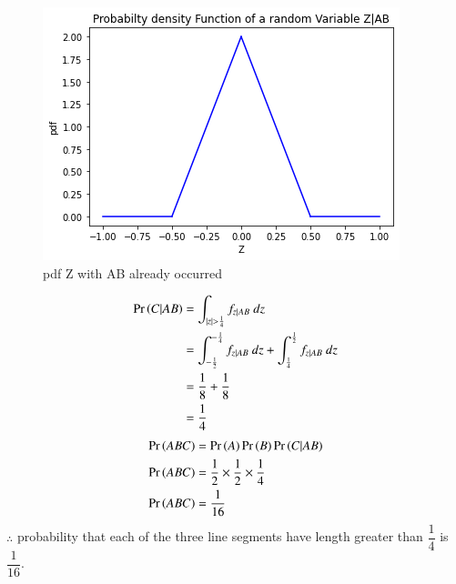 \documentclass[journal,12pt,twocolumn]{IEEEtran}
\begin{document}
\begin{figure}[h]
    \centering
    \includegraphics[width=\columnwidth]{figures/pdf_Z.png}
    \caption{pdf Z with AB already occurred}
    \label{fig:pdf_Z}
\end{figure}
\begin{align}
    \pr{C|AB}&=\int_{|z|>\frac{1}{4}}f_{z|AB}~dz\\
             &=\int_{-\frac{1}{2}}^{-\frac{1}{4}}f_{z|AB}~dz+\int^{\frac{1}{2}}_{\frac{1}{4}}f_{z|AB}~dz\\
             &=\dfrac{1}{8}+\dfrac{1}{8}\\
             &=\dfrac{1}{4}
\end{align}
\begin{align}
    \Pr\left(ABC\right)&=\Pr\left(A\right)\Pr\left(B\right)\Pr\left(C|AB\right)\\
    \Pr\left(ABC\right)&=\dfrac{1}{2}\times \dfrac{1}{2}\times 
    \dfrac{1}{4}\\
    \Pr\left(ABC\right)&=\dfrac{1}{16}
\end{align}
$\therefore$ probability that each of the three line segments have length greater than $\dfrac{1}{4}$ is $\dfrac{1}{16}$.
\end{document}
